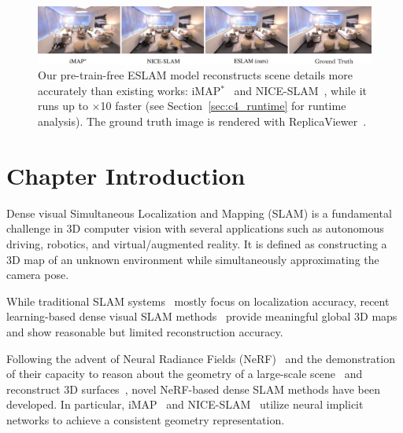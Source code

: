 \begin{figure}[t]
    \begin{center}
        \includegraphics[width=1.0\linewidth]{images/chapter4/figures/Fig1.jpg}
    \end{center}
   \caption{Our pre-train-free ESLAM model reconstructs scene details more accurately than existing works: iMAP$^*$~\citep{sucar2021imap} and NICE-SLAM~\citep{zhu2022nice}, while it runs up to $\times$10 faster (see Section~\ref{sec:c4_runtime} for runtime analysis). The ground truth image is rendered with ReplicaViewer~\citep{replica19arxiv}.}
\end{figure}

\section{Chapter Introduction}

Dense visual Simultaneous Localization and Mapping (SLAM) is a fundamental challenge in 3D computer vision with several applications such as autonomous driving, robotics, and virtual/augmented reality. It is defined as constructing a 3D map of an unknown environment while simultaneously approximating the camera pose.

While traditional SLAM systems~\citep{mur2017orb, engel2014lsd, newcombe2011dtam, schops2019bad, whelan2015elasticfusion, whelan2012kintinuous} mostly focus on localization accuracy, recent learning-based dense visual SLAM methods~\citep{bloesch2018codeslam, yang2022fd, czarnowski2020deepfactors, sucar2020nodeslam, zhi2019scenecode, teed2021droid, mccormac2017semanticfusion, sunderhauf2017meaningful, tang2018ba, koestler2022tandem} provide meaningful global 3D maps and show reasonable but limited reconstruction accuracy.

Following the advent of Neural Radiance Fields (NeRF)~\citep{mildenhall2020nerf} and the demonstration of their capacity to reason about the geometry of a large-scale scene~\citep{deng2022depth, kosiorek2021nerf, chen2021mvsnerf, wei2021nerfingmvs, jain2021putting, wu2022scalable} and reconstruct 3D surfaces~\citep{yariv2021volume, azinovic2022neural, wang2021neus, sun2022neural, or2022stylesdf, li2022bnv, ortiz2022isdf, zhang2021ners, wang2022neuris}, novel NeRF-based dense SLAM methods have been developed. In particular, iMAP~\citep{sucar2021imap} and NICE-SLAM~\citep{zhu2022nice} utilize neural implicit networks to achieve a consistent geometry representation.

